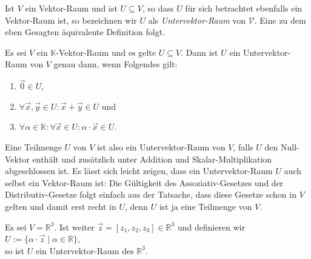 Ist $V$ ein Vektor-Raum und ist $U \subseteq V$, so dass $U$ f\"{u}r sich betrachtet ebenfalls ein
Vektor-Raum ist, so bezeichnen wir $U$ als
\emph{Untervektor-Raum} von $\mathcal{V}$.  Eine zu dem eben Gesagten \"{a}quivalente Definition folgt.

\begin{Definition}
Es sei $V$ ein $\mathbb{K}$-Vektor-Raum und es gelte $U \subseteq V$.
Dann ist $U$ ein Untervektor-Raum von $V$ genau dann, 
wenn Folgendes gilt:
\begin{enumerate}
\item $\vec{0} \in U$,
\item $\forall \vec{x}, \vec{y} \in U: \vec{x} + \vec{y} \in U$ \quad und \quad
\item $\forall \alpha \in \mathbb{K}: \forall \vec{x} \in U: \alpha \cdot \vec{x} \in U$.  \eoxs
\end{enumerate}
\end{Definition}

Eine Teilmenge $U$ von $V$ ist also ein Untervektor-Raum von $V$, falls $U$ den Null-Vektor enth\"{a}lt und zus\"{a}tzlich
unter Addition und Skalar-Multiplikation abgeschlossen ist.  Es l\"{a}sst sich leicht zeigen, dass ein Untervektor-Raum $U$
auch selbst ein Vektor-Raum ist:  Die G\"{u}ltigkeit des Assoziativ-Gesetzes und der Distributiv-Gesetze folgt einfach aus
der Tatsache, dass diese Gesetze schon in $V$ gelten und damit erst recht in $U$, denn $U$ ist ja eine Teilmenge von
$V$. 

\example
Es sei $V = \mathbb{R}^3$.  Ist weiter $\vec{z} = [ z_1, z_2, z_3 ] \in \mathbb{R}^3$ und definieren wir
\\[0.2cm]
\hspace*{1.3cm}
$U := \{ \alpha \cdot \vec{z} \mid \alpha \in \mathbb{R} \}$,
\\[0.2cm]
so ist $U$ ein Untervektor-Raum des $\mathbb{R}^3$.

